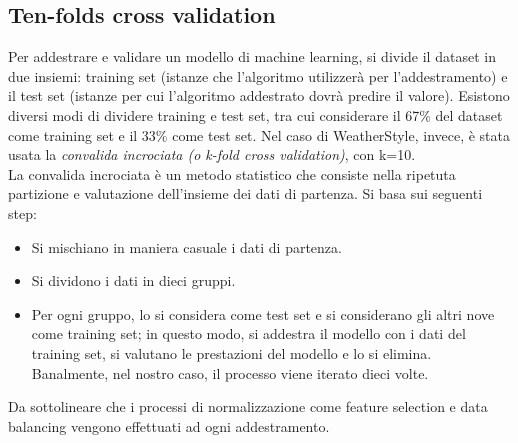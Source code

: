\documentclass[a4paper, 11pt, oneside]{report}
\begin{document}
                \subsection{Ten-folds cross validation}
                Per addestrare e validare un modello di machine learning, si divide il dataset in due insiemi: training
                set (istanze che l'algoritmo utilizzerà per l'addestramento) e il test set (istanze per cui l'algoritmo
                addestrato dovrà predire il valore). Esistono diversi modi di dividere training e test set, tra cui
                considerare il 67\% del dataset come training set e il 33\% come test set. Nel caso di WeatherStyle,
                invece, è stata usata la \textit{convalida incrociata (o k-fold cross validation)}, con k=10.
                \\ \noindent La convalida incrociata è un metodo statistico che consiste nella ripetuta partizione e
                valutazione dell'insieme dei dati di partenza. Si basa sui seguenti step:
                \begin{itemize}
                    \item Si mischiano in maniera casuale i dati di partenza.
                    \item Si dividono i dati in dieci gruppi.
                    \item Per ogni gruppo, lo si considera come test set e si considerano gli altri nove come training set;
                    in questo modo, si addestra il modello con i dati del training set, si valutano le prestazioni del modello
                    e lo si elimina. Banalmente, nel nostro caso, il processo viene iterato dieci volte.
                \end{itemize}
                \par \noindent Da sottolineare che i processi di normalizzazione come feature selection e data balancing
                vengono effettuati ad ogni addestramento.
\end{document}
